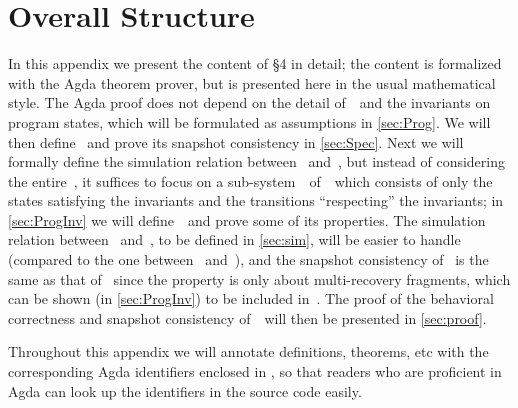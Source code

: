 
\section{Overall Structure}


In this appendix we present the content of \S4 in detail; the content is formalized with the Agda theorem prover, but is presented here in the usual mathematical style.
The Agda proof does not depend on the detail of~\Prog\ and the invariants on program states, which will be formulated as assumptions in \cref{sec:Prog}.
We will then define \Spec\ and prove its snapshot consistency in \cref{sec:Spec}.
Next we will formally define the simulation relation between \Prog~and~\Spec, but instead of considering the entire~\Prog, it suffices to focus on a sub-system~\ProgInv\ of~\Prog\ which consists of only the states satisfying the invariants and the transitions ``respecting'' the invariants; in \cref{sec:ProgInv} we will define~\ProgInv\ and prove some of its properties.
The simulation relation between \ProgInv~and~\Spec, to be defined in \cref{sec:sim}, will be easier to handle (compared to the one between \Prog~and~\Spec), and the snapshot consistency of \ProgInv\ is the same as that of \Prog\ since the property is only about multi-recovery fragments, which can be shown (in \cref{sec:ProgInv}) to be included in~\ProgInv.
The proof of the behavioral correctness and snapshot consistency of~\ProgInv\ will then be presented in \cref{sec:proof}.

Throughout this appendix we will annotate definitions, theorems, etc with the corresponding Agda identifiers enclosed in \AgdaId{\cdot}, so that readers who are proficient in Agda can look up the identifiers in the source code easily.
